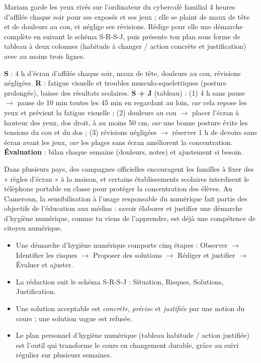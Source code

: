 \documentclass[11pt]{article}
\newcommand{\cle}[1]{{\popxbold\color{popdark}#1}}
\begin{document}
\begin{exercice}
Mariam garde les yeux rivés sur l'ordinateur du cybercafé familial 4 heures d'affilée chaque soir pour ses exposés et ses jeux ; elle se plaint de maux de tête et de douleurs au cou, et néglige ses révisions. Rédige pour elle une démarche complète en suivant le schéma S-R-S-J, puis présente ton plan sous forme de tableau à deux colonnes (habitude à changer / action concrète et justification) avec au moins trois lignes.
\end{exercice}

\begin{corrige}[Exercice 1]
\textbf{S} : 4 h d'écran d'affilée chaque soir, maux de tête, douleurs au cou, révisions négligées. \textbf{R} : fatigue visuelle et troubles musculo-squelettiques (posture prolongée), baisse des résultats scolaires. \textbf{S + J} (tableau) : (1) 4 h sans pause $\rightarrow$ pause de 10 min toutes les 45 min en regardant au loin, \emph{car} cela repose les yeux et prévient la fatigue visuelle ; (2) douleurs au cou $\rightarrow$ placer l'écran à hauteur des yeux, dos droit, à au moins 50 cm, \emph{car} une bonne posture évite les tensions du cou et du dos ; (3) révisions négligées $\rightarrow$ réserver 1 h de devoirs sans écran avant les jeux, \emph{car} les plages sans écran améliorent la concentration. \textbf{Évaluation} : bilan chaque semaine (douleurs, notes) et ajustement si besoin.
\end{corrige}

\begin{savaistu}
Dans plusieurs pays, des campagnes officielles encouragent les familles à fixer des « règles d'écran » à la maison, et certains établissements scolaires interdisent le téléphone portable en classe pour protéger la concentration des élèves. Au Cameroun, la sensibilisation à l'usage responsable du numérique fait partie des objectifs de l'éducation aux médias : savoir élaborer et justifier une démarche d'hygiène numérique, comme tu viens de l'apprendre, est déjà une compétence de citoyen numérique.
\end{savaistu}

\begin{aretenir}
\begin{itemize}
  \item Une démarche d'hygiène numérique comporte cinq étapes : \cle{Observer} $\rightarrow$ \cle{Identifier} les risques $\rightarrow$ \cle{Proposer} des solutions $\rightarrow$ \cle{Rédiger et justifier} $\rightarrow$ \cle{Évaluer} et ajuster.
  \item La rédaction suit le schéma \cle{S-R-S-J} : Situation, Risques, Solutions, Justification.
  \item Une solution acceptable est \emph{concrète}, \emph{précise} et \emph{justifiée} par une notion du cours ; une solution vague est refusée.
  \item Le \cle{plan personnel d'hygiène numérique} (tableau habitude / action justifiée) est l'outil qui transforme le cours en changement durable, grâce au suivi régulier sur plusieurs semaines.
\end{itemize}
\end{aretenir}
\end{document}
